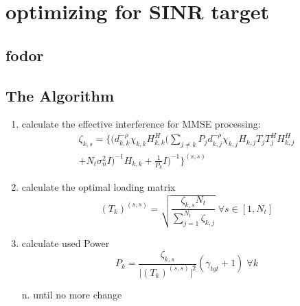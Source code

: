 \section{optimizing for SINR target}
\subsection{fodor}

\subsection{The Algorithm}
\begin{enumerate}
	\item calculate the effective interference for MMSE processing:
		\begin{equation}
			\begin{aligned}
				\zeta_{k,s} = \Biggl\{\Biggl(d^{-\rho}_{k,k}\chi_{k,k}H^H_{k,k}\biggl(\sum_{j\neq k}{P_jd^{-\rho}_{k,j}\chi_{k,j}H_{k,j}T_jT_j^HH^H_{k,j}}\\
				+N_t\sigma^2_nI\biggr)^{-1}H_{k,k}+\frac{1}{P_k}I\Biggr)^{-1}\Biggr\}^{(s,s)}
			\end{aligned}	
		\end{equation}

	\item calculate the optimal loading matrix
		\begin{equation}
			(T_k)^{(s,s)} = \sqrt{\frac{\zeta_{k,s}N_t}{\sum_{j=1}^{N_t}\zeta_{k,j}}}\;\forall s\in[1,N_t]
		\end{equation}

	\item calculate used Power
		\begin{equation}
			P_k = \frac{\zeta_{k,s}}{\vert(T_k)^{(s,s)}\vert^2}(\gamma_{tgt}+1)\;\forall k
		\end{equation}

	\item[n.] until no more change

\end{enumerate}

